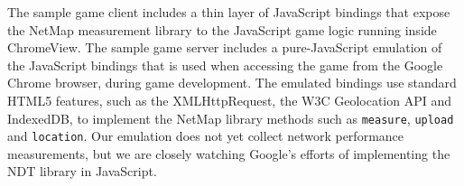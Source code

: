 The sample game client includes a thin layer of JavaScript bindings that expose
the NetMap measurement library to the JavaScript game logic running inside
ChromeView. The sample game server includes a pure-JavaScript emulation of the
JavaScript bindings that is used when accessing the game from the Google Chrome
browser, during game development. The emulated bindings use standard HTML5
features, such as the XMLHttpRequest, the W3C Geolocation API and IndexedDB, to
implement the NetMap library methods such as \texttt{measure}, \texttt{upload}
and \texttt{location}. Our emulation does not yet collect network performance
measurements, but we are closely watching Google's efforts of implementing the
NDT library in JavaScript.
